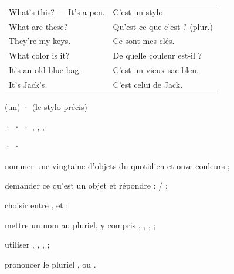 \begin{essentiel}
\begin{minipage}[t]{0.52\linewidth}
\renewcommand{\arraystretch}{1.32}
\begin{tabular}{@{}>{\enOn\otSemi\fontsize{9.4}{11}\selectfont}l<{\enOff}@{\hspace{3mm}}>{\fontsize{9.2}{11}\selectfont\color{white!78!otNavy}}l@{}}
What's this? — It's a pen.   & C'est un stylo.\\
What are these?              & Qu'est-ce que c'est ? (plur.)\\
They're my keys.             & Ce sont mes clés.\\
What color is it?            & De quelle couleur est-il ?\\
It's an old blue bag.        & C'est un vieux sac bleu.\\
It's Jack's.                 & C'est celui de Jack.\\
\end{tabular}
\end{minipage}\hfill
\begin{minipage}[t]{0.42\linewidth}
{\fontsize{9.2}{11.6}\selectfont {} (un) ·  (le stylo précis)\par}
{\fontsize{9.2}{11.6}\selectfont {} ·  ·  · , , , \par}
{\par}
{\fontsize{9.2}{11.6}\selectfont {}  ·   ·  \par}
\end{minipage}
\end{essentiel}

\begin{jesais}
\item nommer une vingtaine d'objets du quotidien et onze couleurs ;
\item demander ce qu'est un objet et répondre :  /  ;
\item choisir entre ,  et  ;
\item mettre un nom au pluriel, y compris , , ,  ;
\item utiliser , , ,  ;
\item prononcer le pluriel ,  ou .
\end{jesais}


